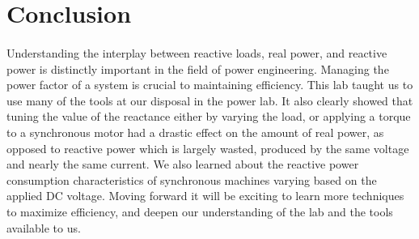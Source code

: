 \section{Conclusion}
\paragraph{}Understanding the interplay between reactive loads, real
power, and reactive power is distinctly important in the field of
power engineering. Managing the power factor of a system is crucial
to maintaining efficiency. This lab taught us to use many of the
tools at our disposal in the power lab. It also clearly showed that
tuning the value of the reactance either by varying the load, or
applying a torque to a synchronous motor had a drastic effect on the
amount of real power, as opposed to reactive power which is largely
wasted, produced by the same voltage and nearly the same current. We
also learned about the reactive power consumption characteristics of
synchronous machines varying based on the applied DC voltage. Moving
forward it will be exciting to learn more techniques to maximize
efficiency, and deepen our understanding of the lab and the tools
available to us.

